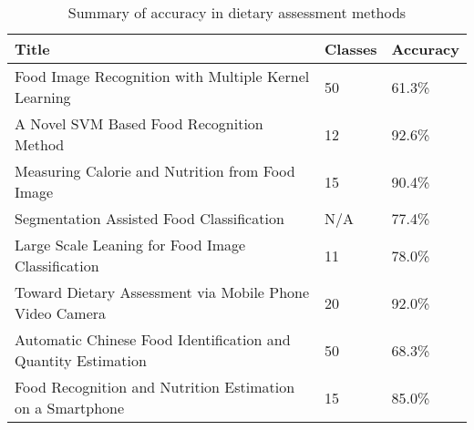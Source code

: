 


\begin{table}[]
\centering
\caption{Summary of accuracy in dietary assessment methods}
\label{other_dietary_summary}
\begin{tabular}{|l|l|l|}
\hline
\textbf{Title}                                                         & \textbf{Classes} & \textbf{Accuracy}   \\ \hline
Food Image Recognition with Multiple Kernel Learning          & 50             & 61.3\%    \\ \hline
A Novel SVM Based Food Recognition Method                     & 12             & 92.6\%     \\ \hline
Measuring Calorie and Nutrition from Food Image               & 15             & 90.4\%    \\ \hline
Segmentation Assisted Food Classification                     & N/A            & 77.4\%     \\ \hline
Large Scale Leaning for Food Image Classification             & 11             & 78.0\%       \\ \hline
Toward Dietary Assessment via Mobile Phone Video Camera       & 20             & 92.0\% \\ \hline
Automatic Chinese Food Identification and Quantity Estimation & 50             & 68.3\%     \\ \hline
Food Recognition and Nutrition Estimation on a Smartphone      & 15             & 85.0\% \\ \hline      
\end{tabular}
\end{table}